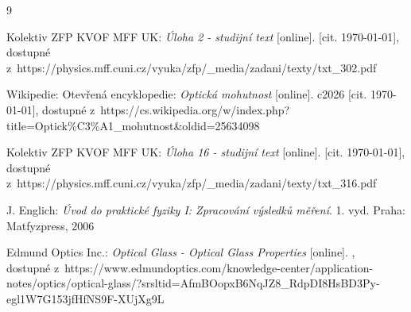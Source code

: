\documentclass{../concepts/titul_zprava_p/prepareprotokolZprava} %
\begin{document}
\begin{thebibliography}{9}

 Kolektiv ZFP KVOF MFF UK: \textit{Úloha 2 - studijní text} [online]. 
[cit. \today], dostupné z~https://physics.mff.cuni.cz/vyuka/zfp/\_media/zadani/texty/txt\_302.pdf


 Wikipedie: Otevřená encyklopedie: \textit{Optická mohutnost} [online]. c2026 [cit. \today], 
dostupné z~https://cs.wikipedia.org/w/index.php?title=Optick\%C3\%A1\_mohutnost\&oldid=25634098

 Kolektiv ZFP KVOF MFF UK: \textit{Úloha 16 - studijní text} 
[online]. [cit. \today], dostupné
z~https://physics.mff.cuni.cz/vyuka/zfp/\_media/zadani/texty/txt\_316.pdf

 J. Englich: \textit{Úvod do praktické fyziky I: Zpracování výsledků měření}. 
1. vyd. Praha: Matfyzpress, 2006


 Edmund Optics Inc.: \textit{Optical Glass - Optical Glass Properties}
[online]. , \\
dostupné z~https://www.edmundoptics.com/knowledge-center/application-notes/optics/optical-glass/?srsltid=AfmBOopxB6NqJZ8\_RdpDI8HsBD3Py-egl1W7G153jfHfNS9F-XUjXg9L



\end{thebibliography}
\end{document}
